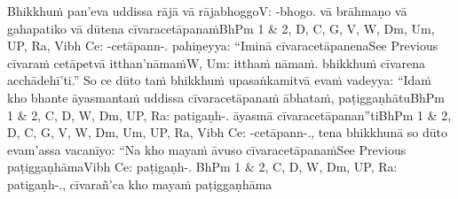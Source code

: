 Bhikkhuṁ pan'eva uddissa rājā vā rājabhoggo\makeatletter\hyperlink{endnote-appendix}\makeatother V: -bhogo.  vā brāhmaṇo vā gahapatiko vā dūtena cīvaracetāpanaṁ\makeatletter\hyperlink{endnote-appendix}\makeatother BhPm 1 & 2, D, C, G, V, W, Dm, Um, UP, Ra, Vibh Ce: -cetāpann-.  pahiṇeyya: ``Iminā cīvaracetāpanena\makeatletter\hyperlink{endnote-appendix}\makeatother See Previous cīvaraṁ cetāpetvā itthan'nāmaṁ\makeatletter\hyperlink{endnote-appendix}\makeatother W, Um: itthaṁ nāmaṁ. bhikkhuṁ cīvarena acchādehī'ti.'' So ce dūto taṁ bhikkhuṁ upasaṅkamitvā evaṁ vadeyya: ``Idaṁ kho bhante āyasmantaṁ uddissa cīvaracetāpanaṁ ābhataṁ, paṭiggaṇhātu\makeatletter\hyperlink{endnote-appendix}\makeatother BhPm 1 & 2, C, D, W, Dm, UP, Ra: patigaṇh-. āyasmā cīvaracetāpanan''ti\makeatletter\hyperlink{endnote-appendix}\makeatother BhPm 1 & 2, D, C, G, V, W, Dm, Um, UP, Ra, Vibh Ce: -cetāpann-., tena bhikkhunā so dūto evam'assa vacanīyo: ``Na kho mayaṁ āvuso cīvaracetāpanaṁ\makeatletter\hyperlink{endnote-appendix}\makeatother See Previous paṭiggaṇhāma\makeatletter\hyperlink{endnote-appendix}\makeatother Vibh Ce: paṭigaṇh-. BhPm 1 & 2, C, D, W, Dm, UP, Ra: patigaṇh-., cīvarañ'ca kho mayaṁ paṭiggaṇhāma\makeatletter\hyperlink{endnote-appendix}
